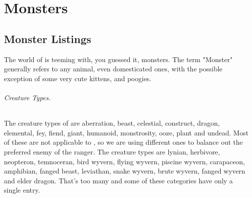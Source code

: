 
\newcommand{\monsterheader}[4]{%
\vspace{10pt plus 10pt minus 2pt}%
\noindent\begin{minipage}[c]{1cm}%
\texttt{[image: \#1.png]}%
\end{minipage}\hfill%
\begin{minipage}{\dimexpr -1em-1cm+\linewidth}%
\subsection*{#2}\index{#2}%
{\textit{Rating: } \raisebox{-2pt}[0pt]{#3} \textit{(#4)}\par}%
\end{minipage}\nopagebreak\\*[3pt]}

\newcommand{\sizecrowns}[2]{\hfill\mbox{\footnotesize\tableicon{crown-small}\,#1\,cm\quad\tableicon{crown-gold}\,#2\,cm\par}}

\renewcommand*{\hbPartCover}{assets/ext/lagiacrus}
\renewcommand*{\hbPartSubcover}{assets/ext/lagiacrus2}
\part{Monsters}

\chapter{Monster Listings}
The world of \MH{} is teeming with, you guessed it, monsters. The term "Monster" generally refers to any animal, even domesticated ones, with the possible exception of some very cute kittens, and poogies.

\paragraph{Creature Types.} The creature types of \DND{} are aberration, beast, celestial, construct, dragon, elemental, fey, fiend, giant, humanoid, monstrosity, ooze, plant and undead. Most of these are not applicable to \MH{}, so we are using different ones to balance out the preferred enemy of the ranger. The \MH{} creature types are lynian, herbivore, neopteron, temnoceran, bird wyvern, flying wyvern, piscine wyvern, carapaceon, amphibian, fanged beast, leviathan, snake wyvern, brute wyvern, fanged wyvern and elder dragon. That's too many and some of these categories have only a single entry.

